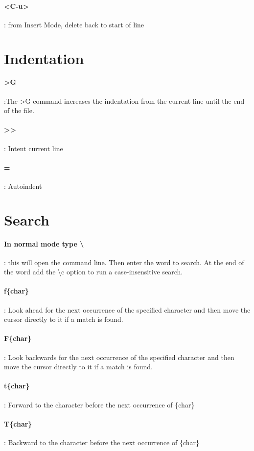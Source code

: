 \documentclass[10pt,letterpaper]{book}
\begin{document}
\paragraph{<C-u>}: from Insert Mode, delete back to start of line
\section{Indentation}
\paragraph{>G}:The >G command increases the indentation from the current line until the end of the file.
\paragraph{>>}: Intent current line
\paragraph{=}: Autoindent
\section{Search}
\paragraph{In normal mode type \textbackslash}: this will open the command line. Then enter the word to search. At the end of the word add the \textbackslash c option to run a case-insensitive search.

\paragraph{f\{char\}}: Look ahead for the next occurrence of the specified character and then move the cursor directly to it if a match is found.
\paragraph{F\{char\}}: Look backwards for the next occurrence of the specified character and then move the cursor directly to it if a match is found.
\paragraph{t\{char\}}: Forward to the character before the next occurrence of \{char\}
\paragraph{T\{char\}}: Backward to the character before the next occurrence of \{char\}
\end{document}
